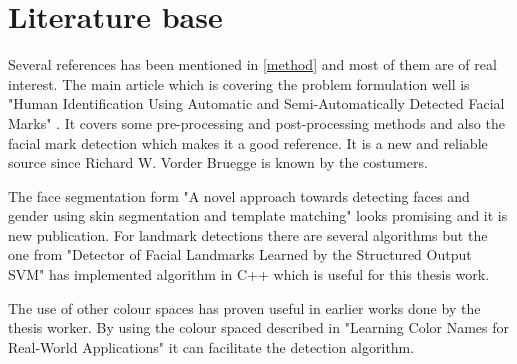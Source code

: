 \section{Literature base}

Several references has been mentioned in \cref{method} and most of them are of real interest. The main article which is covering the problem formulation well is "Human Identification Using Automatic and Semi-Automatically Detected Facial Marks" \cite{automatic_detector_2015}. It covers some pre-processing and post-processing methods and also the facial mark detection which makes it a good reference. It is a new and reliable source since Richard W. Vorder Bruegge is known by the costumers. 

The face segmentation form "A novel approach towards detecting faces and gender using skin segmentation and template matching" \cite{face_segmentation_skin} looks promising and it is new publication. For landmark detections there are several algorithms but the one from "Detector of Facial Landmarks Learned by the Structured Output SVM" \cite{landmarks_SVM} has implemented algorithm in C++ which is useful for this thesis work.

The use of other colour spaces has proven useful in earlier works done by the thesis worker. By using the colour spaced described in "Learning Color Names for Real-World Applications" \cite{11_colours} it can facilitate the detection algorithm. 